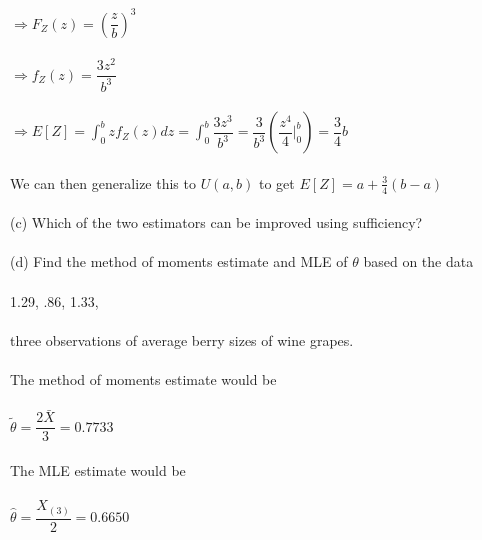 \documentclass{article}
\begin{document}
$\Rightarrow F_Z(z)=(\dfrac{z}{b})^3$\\\\
$\Rightarrow f_Z(z)=\dfrac{3z^2}{b^3}$\\\\
$\Rightarrow E[Z]=\int_0^bzf_Z(z)dz=\int_0^b\dfrac{3z^3}{b^3}=\dfrac{3}{b^3}(\dfrac{z^4}{4}\bigg|_0^b)=\dfrac{3}{4}b$\\\\
We can then generalize this to $U(a,b)$ to get $E[Z]=a+\frac{3}{4}(b-a)$\\\\
(c) Which of the two estimators can be improved using sufficiency?\\\\
(d) Find the method of moments estimate and MLE of $\theta$ based on the data\\\\
1.29, .86, 1.33,\\\\
three observations of average berry sizes of wine grapes.\\\\
The method of moments estimate would be\\\\
$\tilde{\theta}=\dfrac{2\bar{X}}{3}=0.7733$\\\\
The MLE estimate would be\\\\
$\hat{\theta}=\dfrac{X_{(3)}}{2}=0.6650$
\pagebreak
\end{document}
